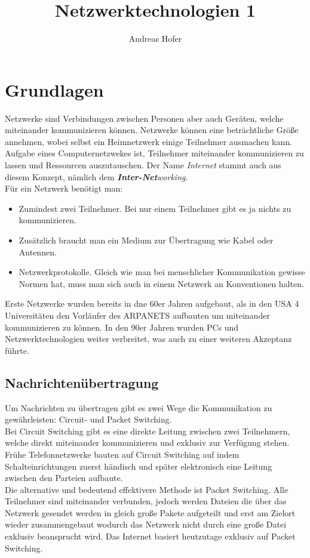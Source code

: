 \documentclass{article}
\title{\vspace{-3cm} Netzwerktechnologien 1}
\author{Andreas Hofer}
\begin{document}
	\maketitle
	\tableofcontents
	\section{Grundlagen}
	Netzwerke sind Verbindungen zwischen Personen aber auch Geräten, welche miteinander kommunizieren können. Netzwerke können eine beträchtliche Größe annehmen, wobei selbst ein Heimnetzwerk einige Teilnehmer ausmachen kann. Aufgabe eines Computernetzwekes ist, Teilnehmer miteinander kommunizieren zu lassen und Ressourcen auszutauschen. Der Name \textit{Internet} stammt auch aus diesem Konzept, nämlich dem \textit{\textbf{Inter-Net}working}. \\
	Für ein Netzwerk benötigt man:
	\begin{itemize}
	 	\item{Zumindest zwei Teilnehmer. Bei nur einem Teilnehmer gibt es ja nichts zu kommunizieren.}
	 	\item{Zusätzlich braucht man ein Medium zur Übertragung wie Kabel oder Antennen.}
	 	\item{Netzwerkprotokolle. Gleich wie man bei menschlicher Kommunikation gewisse Normen hat, muss man sich auch in einem Netzwerk an Konventionen halten.}
	 \end{itemize}
	 Erste Netzwerke wurden bereits in dne 60er Jahren aufgebaut, als in den USA 4 Universitäten den Vorläufer des ARPANETS aufbauten um miteinander kommunizieren zu können. In den 90er Jahren wurden PCs und Netzwerktechnologien weiter verbreitet, was auch zu einer weiteren Akzeptanz führte. \\
	 \subsection{Nachrichtenübertragung}
	 Um Nachrichten zu übertragen gibt es zwei Wege die Kommunikation zu gewährleisten: Circuit- und Packet Switching. \\
	 Bei Circuit Switching gibt es eine direkte Leitung zwischen zwei Teilnehmern, welche direkt miteinander kommunizieren und exklusiv zur Verfügung stehen. Frühe Telefonnetzwerke bauten auf Circuit Switching auf indem Schalteinrichtungen zuerst händisch und später elektronisch eine Leitung zwischen den Parteien aufbaute. \\
	 Die alternative und bedeutend effektivere Methode ist Packet Switching. Alle Teilnehmer sind miteinander verbunden, jedoch werden Dateien die über das Netzwerk gesendet werden in gleich große Pakete aufgeteilt und erst am Zielort wieder zusammengebaut wodurch das Netzwerk nicht durch eine große Datei exklusiv beansprucht wird. Das Internet basiert heutzutage exklusiv auf Packet Switching. \\
\end{document}
